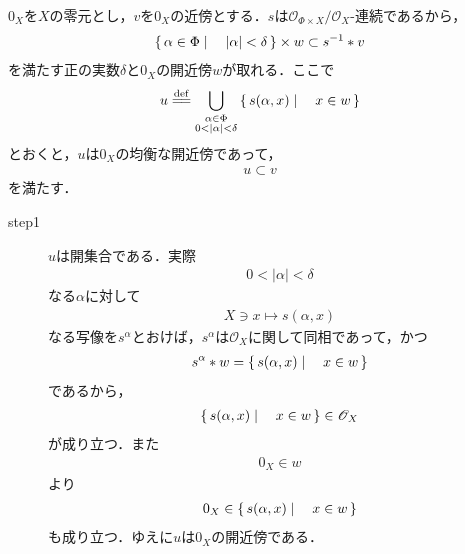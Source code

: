	\begin{sketch}
		$0_X$を$X$の零元とし，$v$を$0_X$の近傍とする．$s$は$\mathscr{O}_{\Phi \times X}/\mathscr{O}_X$-連続であるから，
		\begin{align}
			\left\{\, \alpha \in \Phi \mid \quad |\alpha| < \delta\, \right\} \times w \subset s^{-1} \ast v
		\end{align}
		を満たす正の実数$\delta$と$0_X$の開近傍$w$が取れる．ここで
		\begin{align}
			u \defeq \bigcup_{\substack{\alpha \in \Phi \\ 0 < |\alpha| < \delta}} \Set{s(\alpha,x)}{x \in w}
		\end{align}
		とおくと，$u$は$0_X$の均衡な開近傍であって，
		\begin{align}
			u \subset v
		\end{align}
		を満たす．
		\begin{description}
			\item[step1] $u$は開集合である．実際
				\begin{align}
					0 < |\alpha| < \delta
				\end{align}
				なる$\alpha$に対して
				\begin{align}
					X \ni x \longmapsto s(\alpha,x)
				\end{align}
				なる写像を$s^\alpha$とおけば，$s^\alpha$は$\mathscr{O}_X$に関して同相であって，かつ
				\begin{align}
					s^\alpha \ast w = \left\{\, s(\alpha,x) \mid \quad x \in w\, \right\}
				\end{align}
				であるから，
				\begin{align}
					\left\{\, s(\alpha,x) \mid \quad x \in w\, \right\} \in \mathscr{O}_X
				\end{align}
				が成り立つ．また
				\begin{align}
					0_X \in w
				\end{align}
				より
				\begin{align}
					0_X \in \left\{\, s(\alpha,x) \mid \quad x \in w\, \right\}
				\end{align}
				も成り立つ．ゆえに$u$は$0_X$の開近傍である．
				

\end{description}
\end{sketch}
